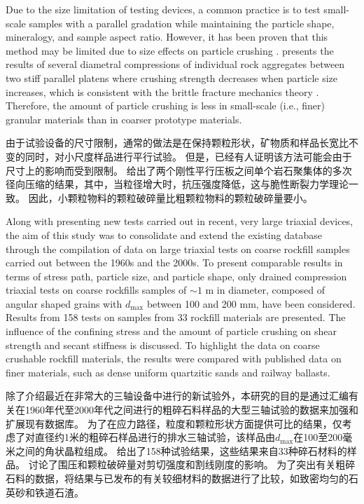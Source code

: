 \begin{ParaColumn}
    \switchcolumn*

    Due to the size limitation of testing devices, a common practice is to test small-scale samples with a parallel gradation while maintaining the particle shape, mineralogy, and sample aspect ratio. However, it has been proven that this method may be limited due to size effects on particle crushing \citep{Marachi1969,Frossard2012415,Ovalle20142199}.  presents the results of several diametral compressions of individual rock aggregates between two stiff parallel platens where crushing strength decreases when particle size increases, which is consistent with the brittle fracture mechanics theory \citep{Weibull19391}. Therefore, the amount of particle crushing is less in small-scale (i.e., finer) granular materials than in coarser prototype materials.

    \switchcolumn

    由于试验设备的尺寸限制，通常的做法是在保持颗粒形状，矿物质和样品长宽比不变的同时，对小尺度样品进行平行试验。 但是，已经有人证明该方法可能会由于尺寸上的影响而受到限制\citep{Marachi1969,Frossard2012415,Ovalle20142199}。 给出了两个刚性平行压板之间单个岩石聚集体的多次径向压缩的结果，其中，当粒径增大时，抗压强度降低，这与脆性断裂力学理论\citep{Weibull19391}一致。 因此，小颗粒物料的颗粒破碎量比粗颗粒物料的颗粒破碎量要小。

    \CrossColumnText{
        
    }

    \switchcolumn*

    Along with presenting new tests carried out in recent, very large triaxial devices, the aim of this study was to consolidate and extend the existing database through the compilation of data on large triaxial tests on coarse rockfill samples carried out between the 1960s and the 2000s. To present comparable results in terms of stress path, particle size, and particle shape, only drained compression triaxial tests on coarse rockfills samples of $\sim 1$ m in diameter, composed of angular shaped grains with $d_{\max}$ between 100 and 200 mm, have been considered. Results from 158 tests on samples from 33 rockfill materials are presented. The influence of the confining stress and the amount of particle crushing on shear strength and secant stiffness is discussed. To highlight the data on coarse crushable rockfill materials, the results were compared with published data on finer materials, such as dense uniform quartzitic sands and railway ballasts.

    \switchcolumn

    除了介绍最近在非常大的三轴设备中进行的新试验外，本研究的目的是通过汇编有关在1960年代至2000年代之间进行的粗碎石料样品的大型三轴试验的数据来加强和扩展现有数据库。 为了在应力路径，粒度和颗粒形状方面提供可比的结果，仅考虑了对直径约1米的粗碎石样品进行的排水三轴试验，该样品由$d_{\max}$在100至200毫米之间的角状晶粒组成。 给出了158种试验结果，这些结果来自33种碎石材料的样品。 讨论了围压和颗粒破碎量对剪切强度和割线刚度的影响。 为了突出有关粗碎石料的数据，将结果与已发布的有关较细材料的数据进行了比较，如致密均匀的石英砂和铁道石渣。

\end{ParaColumn}